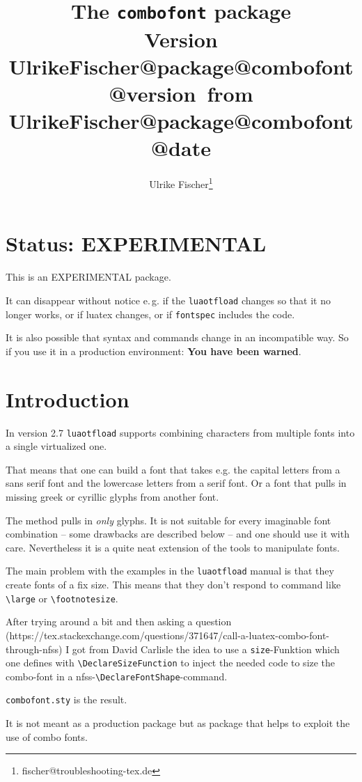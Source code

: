 \documentclass[parskip=half-,egregdoesnotlikesansseriftitles]{scrartcl}
\title{The \texttt{combofont} package \\ 
{\normalsize Version \csname UlrikeFischer@package@combofont@version\endcsname\  
from \csname UlrikeFischer@package@combofont@date\endcsname}}
\author{Ulrike Fischer\thanks{fischer@troubleshooting-tex.de}}
\newcommand\package[1]{\texttt{#1}}
\begin{document}
\maketitle

\section{Status: EXPERIMENTAL}

This is an EXPERIMENTAL package.

It can disappear without notice e.\,g. if the \package{luaotfload} changes so that it no longer works, or if luatex changes, or if \package{fontspec} includes the code.

It is also possible that syntax and commands change in an incompatible way. So if you use it in a production environment: \textbf{You have been warned}.

\section{Introduction}
In version 2.7 \package{luaotfload} supports combining characters from multiple fonts into a single virtualized one.

That means that one can build a font that takes e.g. the capital letters from a sans serif font and the lowercase letters from a serif font. Or a font that pulls in missing greek or cyrillic glyphs from another font.

The method pulls in \emph{only} glyphs. It is not suitable for every imaginable font combination -- some drawbacks are described below -- and one should use it with care. Nevertheless it is a quite neat extension of the tools to manipulate fonts.

The main problem with the examples in the \package{luaotfload} manual is that they create fonts of a fix size. This means that they don't respond to command like \verb+\large+ or \verb+\footnotesize+.

After trying around a bit and then asking a question (https://tex.stackexchange.com/questions/371647/call-a-luatex-combo-font-through-nfss) I got from David Carlisle the idea to use a \texttt{size}-Funktion which one defines with \verb+\DeclareSizeFunction+ to inject the needed code to size the combo-font in a nfss-\verb+\DeclareFontShape+-command.

\package{combofont.sty} is the result.

It is not meant as a production package but as package that helps to exploit the use of combo fonts.
\end{document}
